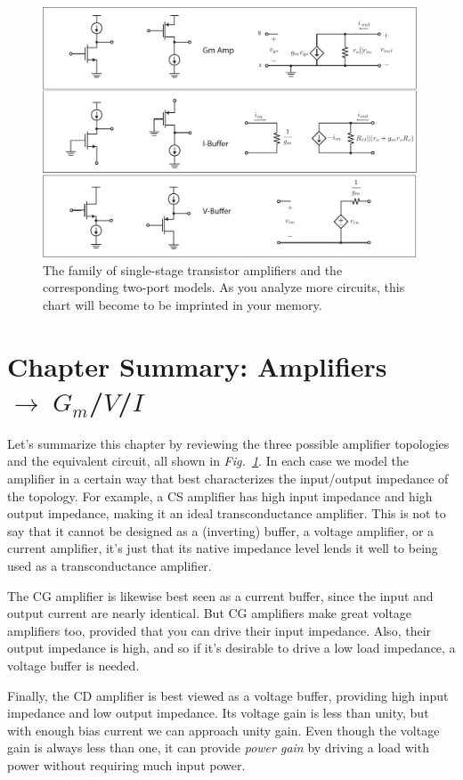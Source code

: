 \begin{figure}[t]
\centering
\includegraphics[width=\columnwidth]{ampchart_models}
\caption{The family of single-stage transistor amplifiers and the corresponding two-port models.  As you analyze more circuits, this chart will become to be imprinted in your memory.}
\label{fig:ampchart_models}
\end{figure}
\section{Chapter Summary: Amplifiers \texorpdfstring{$\rightarrow \; G_m$/$V$/$I$}{}}
Let's summarize this chapter by reviewing the three possible amplifier topologies and the equivalent circuit, all shown in \emph{Fig.~\ref{fig:ampchart_models}}.  In each case we model the amplifier in a certain way that best characterizes the input/output impedance of the topology.  For example, a CS amplifier has high input impedance and high output impedance, making it an ideal transconductance amplifier.  This is not to say that it cannot be designed as a (inverting) buffer, a voltage amplifier, or a current amplifier, it's just that its native impedance level lends it well to being used as a transconductance amplifier.  

The CG amplifier is likewise best seen as a current buffer, since the input and output current are nearly identical.  But CG amplifiers make great voltage amplifiers too, provided that you can drive their input impedance.  Also, their output impedance is high, and so if it's desirable to drive a low load impedance, a voltage buffer is needed.  

Finally, the CD amplifier is best viewed as a voltage buffer, providing high input impedance and low output impedance.  Its voltage gain is less than unity, but with enough bias current we can approach unity gain.  Even though the voltage gain is always less than one, it can provide \emph{power gain} by driving a load with power without requiring much input power.
